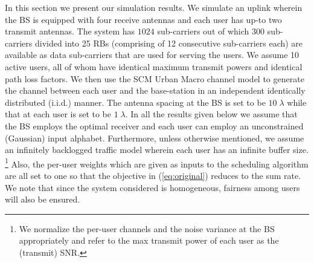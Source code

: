 \documentclass[11pt] {article}
\begin{document}
In this section we present our simulation results.
We simulate an uplink  wherein the BS is equipped with four receive antennas and each user has up-to two transmit antennas.  The system has $1024$ sub-carriers out of which  $300$ sub-carriers  divided into 25 RBs (comprising of 12 consecutive sub-carriers each) are available as  data sub-carriers that are used for serving the users.
  We assume 10 active users, all of whom have identical maximum transmit powers and identical path loss factors. We then use the SCM Urban Macro channel model \cite{3gpp}  to  generate the channel between each user and the base-station in an independent identically distributed (i.i.d.) manner. The antenna spacing at the BS is set to be $10\;\lambda$ while that at each user is set to be $1\;\lambda$. In all the results given below  we assume that the BS employs the optimal receiver and each user can employ an unconstrained (Gaussian) input alphabet. Furthermore, unless otherwise mentioned, we assume an infinitely backlogged traffic model wherein each user has an infinite buffer size.  \footnote{We normalize the per-user channels and the noise variance at the BS appropriately and refer to the max transmit power of each user as the (transmit) SNR.} Also, the  per-user weights which are given as inputs to the scheduling algorithm are all set to one so that the objective in (\ref{eq:original}) reduces to the sum rate. We note that since the system considered is homogeneous, fairness among users will also be ensured.
\end{document}
